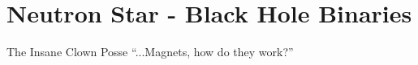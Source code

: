 \part[Neutron Star - Black Hole Binaries]{Neutron Star - Black Hole Binaries} \label{partII}



\vspace{-16pt} \begin{chapquote}{The Insane Clown Posse} \singlespacing ``...Magnets, how do they work?'' 
 \end{chapquote} \vspace{-8pt}
\noindent\makebox[\linewidth]{\rule{0.5\textwidth}{0.5pt}} \vspace{1pt}





















